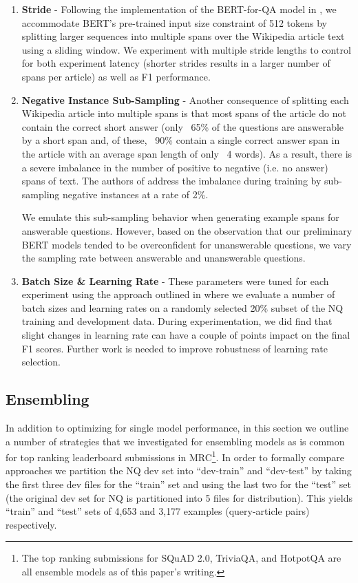 \documentclass[letterpaper]{article} \usepackage{aaai20}  \usepackage{times}  \usepackage{helvet} \usepackage{courier}  \usepackage[hyphens]{url}  \usepackage{graphicx} \urlstyle{rm} \def\UrlFont{\rm}  \usepackage{graphicx}  \frenchspacing  \setlength{\pdfpagewidth}{8.5in}  \setlength{\pdfpageheight}{11in}  \usepackage{amsmath}
\newcommand{\bertbase}{BERT}
\begin{document}
\begin{enumerate}
  \item \textbf{Stride} - Following the implementation of the BERT-for-QA model in \cite{Devlin2018BERTPO}, we accommodate BERT's pre-trained input size constraint of 512 tokens by splitting larger sequences into multiple spans over the Wikipedia article text using a sliding window. We experiment with multiple stride lengths to control for both experiment latency (shorter strides results in a larger number of spans per article) as well as F1 performance.
  
  \item \textbf{Negative Instance Sub-Sampling} - Another consequence of splitting each Wikipedia article into multiple spans is that most spans of the article do not contain the correct short answer (only ~65\% of the questions are answerable by a short span and, of these, ~90\% contain a single correct answer span in the article with an average span length of only ~4 words). As a result, there is a severe imbalance in the number of positive to negative (i.e. no answer) spans of text. The authors of \cite{alberti2019bert} address the imbalance during training by sub-sampling negative instances at a rate of 2\%.
  
  We emulate this sub-sampling behavior when generating example spans for answerable questions.  However, based on the observation that our preliminary \bertbase{} models tended to be overconfident for unanswerable questions, we vary the sampling rate between answerable and unanswerable questions. 
  
  \item \textbf{Batch Size \& Learning Rate} - These parameters were tuned for each experiment using the approach outlined in \cite{smith2018disciplined} where we evaluate a number of batch sizes and learning rates on a randomly selected 20\% subset of the NQ training and development data. During experimentation, we did find that slight changes in learning rate can have a couple of points impact on the final F1 scores. Further work is needed to improve robustness of learning rate selection.
  
\end{enumerate}

\subsection{Ensembling}
In addition to optimizing for single model performance, in this section we outline a number of strategies that we investigated for ensembling models as is common for top ranking leaderboard submissions in MRC\footnote{The top ranking submissions for SQuAD 2.0, TriviaQA, and HotpotQA are all ensemble models as of this paper's writing.}.
In order to formally compare approaches we partition the NQ dev set into ``dev-train'' and ``dev-test'' by taking the first three dev files for the ``train'' set and using the last two for the ``test'' set (the original dev set for NQ is partitioned into 5 files for distribution).  This yields ``train'' and ``test'' sets of 4,653 and 3,177 examples (query-article pairs) respectively.  
\end{document}
